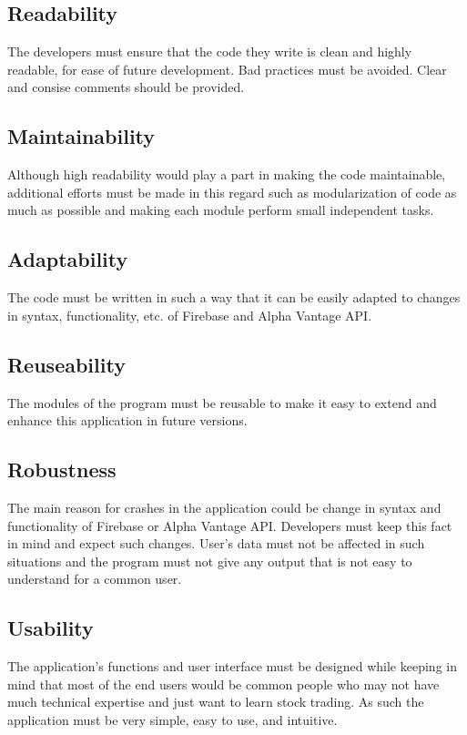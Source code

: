 \documentclass[12 pt, a4paper]{report}
\begin{document}
	\subsection{Readability}
	The developers must ensure that the code they write is clean and highly readable, for ease of future development. Bad practices must be avoided. Clear and consise comments should be provided.
	\subsection{Maintainability}
	Although high readability would play a part in making the code maintainable, additional efforts must be made in this regard such as modularization of code as much as possible and making each module perform small independent tasks.
	\subsection{Adaptability}
	The code must be written in such a way that it can be easily adapted to changes in syntax, functionality, etc. of Firebase and Alpha Vantage API.
	\subsection{Reuseability}
	The modules of the program must be reusable to make it easy to extend and enhance this application in future versions.
	\subsection{Robustness}
	The main reason for crashes in the application could be change in syntax and functionality of Firebase or Alpha Vantage API. Developers must keep this fact in mind and expect such changes. User's data must not be affected in such situations and the program must not give any output that is not easy to understand for a common user.
	\subsection{Usability}
	The application's functions and user interface must be designed while keeping in mind that most of the end users would be common people who may not have much technical expertise and just want to learn stock trading. As such the application must be very simple, easy to use, and intuitive.
		
		
		
	
\end{document}
